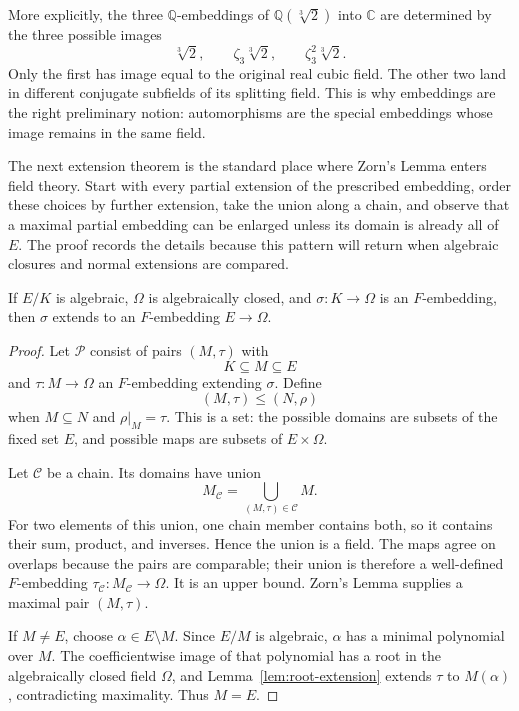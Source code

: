 More explicitly, the three \(\mathbb Q\)-embeddings of
\(\mathbb Q(\sqrt[3]2)\) into \(\mathbb C\) are determined by the three
possible images
\[
\sqrt[3]2,
\qquad
\zeta_3\sqrt[3]2,
\qquad
\zeta_3^2\sqrt[3]2.
\]
Only the first has image equal to the original real cubic field.  The other
two land in different conjugate subfields of its splitting field.  This is
why embeddings are the right preliminary notion: automorphisms are the
special embeddings whose image remains in the same field.

The next extension theorem is the standard place where Zorn's Lemma enters
field theory.  Start with every partial extension of the prescribed embedding,
order these choices by further extension, take the union along a chain, and
observe that a maximal partial embedding can be enlarged unless its domain is
already all of \(E\).  The proof records the details because this pattern will
return when algebraic closures and normal extensions are compared.

\begin{theorem}\label{thm:embedding-extension}
If \(E/K\) is algebraic, \(\Omega\) is algebraically closed, and
\(\sigma:K\to\Omega\) is an \(F\)-embedding, then \(\sigma\) extends to an
\(F\)-embedding \(E\to\Omega\).
\end{theorem}
\begin{proof}
Let \(\mathcal P\) consist of pairs \((M,\tau)\) with
\[
K\subseteq M\subseteq E
\]
and \(\tau:M\to\Omega\) an \(F\)-embedding extending \(\sigma\).  Define
\[
(M,\tau)\leq(N,\rho)
\]
when \(M\subseteq N\) and \(\rho|_M=\tau\).  This is a set: the possible
domains are subsets of the fixed set \(E\), and possible maps are subsets of
\(E\times\Omega\).

Let \(\mathcal C\) be a chain.  Its domains have union
\[
M_{\mathcal C}=\bigcup_{(M,\tau)\in\mathcal C}M.
\]
For two elements of this union, one chain member contains both, so it
contains their sum, product, and inverses.  Hence the union is a field.  The
maps agree on overlaps because the pairs are comparable; their union is
therefore a well-defined \(F\)-embedding
\(\tau_{\mathcal C}:M_{\mathcal C}\to\Omega\).  It is an upper bound.
Zorn's Lemma supplies a maximal pair \((M,\tau)\).

If \(M\ne E\), choose \(\alpha\in E\setminus M\).  Since \(E/M\) is
algebraic, \(\alpha\) has a minimal polynomial over \(M\).  The coefficientwise
image of that polynomial has a root in the algebraically closed field
\(\Omega\), and Lemma~\ref{lem:root-extension} extends \(\tau\) to
\(M(\alpha)\), contradicting maximality.  Thus \(M=E\).
\end{proof}

